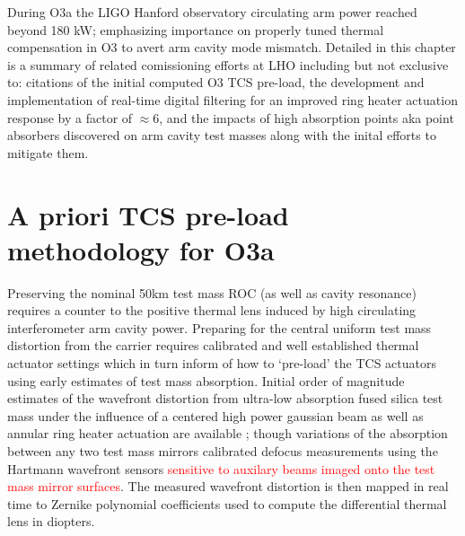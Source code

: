 



During O3a the LIGO Hanford observatory circulating arm power reached beyond 180 kW; emphasizing importance on properly tuned thermal compensation in O3 to avert arm cavity mode mismatch. Detailed in this chapter is a summary of related comissioning efforts at LHO including but not exclusive to: citations of the initial computed O3 TCS pre-load, the development and implementation of real-time digital filtering for an improved ring heater actuation response by a factor of $\approx 6$, and the impacts of high absorption points aka point absorbers discovered on arm cavity test masses along with the inital efforts to mitigate them. 

\section{A priori TCS pre-load methodology for O3a}
Preserving the nominal 50km test mass ROC (as well as cavity resonance) requires a counter to the positive thermal lens induced by high circulating interferometer arm cavity power. Preparing for the central uniform test mass distortion from the carrier requires calibrated and well established thermal actuator settings which in turn inform of how to `pre-load' the TCS actuators using early estimates of test mass absorption. Initial order of magnitude estimates of the wavefront distortion from ultra-low absorption fused silica test mass under the influence of a centered high power gaussian beam as well as annular ring heater actuation are available \cite{hellovinet, Ramette:16}; though variations of the absorption between any two test mass mirrors calibrated defocus measurements using the Hartmann wavefront sensors \textcolor{red}{sensitive to auxilary beams imaged onto the test mass mirror surfaces}. The measured wavefront distortion is then mapped in real time to Zernike polynomial coefficients used to compute the differential thermal lens in diopters. 

